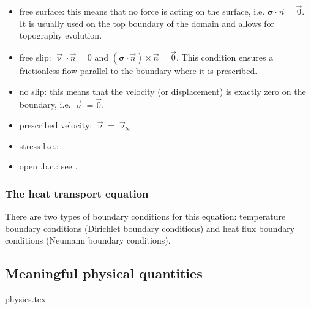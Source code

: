 \begin{itemize}
\item { free surface}: this means that no force is acting on the surface, i.e. ${\bm \sigma}\cdot {\vec n}={\vec 0}$. It is usually used on the top boundary of the domain and allows for topography evolution.
\item { free slip}: ${\vec \upnu}\cdot \vec n = 0$ and $({\bm \sigma}\cdot{\vec n})\times {\vec n}={\vec 0}$. This condition ensures a frictionless flow parallel to the boundary where it is prescribed.
\item { no slip}: this means that the velocity (or displacement) is exactly zero on the boundary, i.e. ${\vec \upnu}={\vec 0}$.
\item { prescribed velocity}: ${\vec \upnu}={\vec \upnu}_{bc}$
\item stress b.c.: 
\item open .b.c.: see . 
\end{itemize}

\subsubsection{The heat transport equation}

There are two types of boundary conditions for this equation: temperature boundary conditions (Dirichlet boundary conditions) and heat flux boundary conditions (Neumann boundary conditions). 

\newpage
\subsection{Meaningful physical quantities}
\begin{flushright} {\tiny {\color{gray} physics.tex}} \end{flushright}

